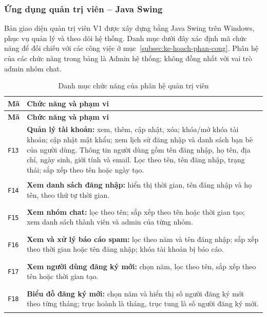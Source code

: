 \subsubsection{Ứng dụng quản trị viên -- Java Swing}
\label{subsubsec:client-admin}

Bản giao diện quản trị viên V1 được xây dựng bằng Java Swing trên Windows,
phục vụ quản lý và theo dõi hệ thống. Danh mục dưới đây xác định mã chức năng
để đối chiếu với các công việc ở mục~\ref{subsec:ke-hoach-phan-cong}.
Phân hệ của các chức năng trong bảng
là Admin hệ thống; không đồng nhất với vai trò admin nhóm chat.

\begingroup
\small
\begin{longtable}{|C{1.2cm}|L{\dimexpr\textwidth-1.2cm-4\arrayrulewidth\relax}|}
  \caption{Danh mục chức năng của phân hệ quản trị viên}
  \label{tab:chuc-nang-admin}\\
  \hline
  \textbf{Mã} & \textbf{Chức năng và phạm vi}\\
  \hline
  \endfirsthead
  \hline
  \textbf{Mã} & \textbf{Chức năng và phạm vi}\\
  \hline
  \endhead
  \hypertarget{F13}{\texttt{F13}} &
  \textbf{Quản lý tài khoản:} xem, thêm, cập nhật, xóa; khóa/mở khóa tài khoản;
  cập nhật mật khẩu; xem lịch sử đăng nhập và danh sách bạn bè của người dùng.
  Thông tin người dùng gồm tên đăng nhập, họ tên, địa chỉ, ngày sinh,
  giới tính và email.
  Lọc theo tên, tên đăng nhập, trạng thái; sắp xếp theo tên hoặc ngày tạo.\\
  \hline
  \hypertarget{F14}{\texttt{F14}} &
  \textbf{Xem danh sách đăng nhập:} hiển thị thời gian, tên đăng nhập và họ tên,
  theo thứ tự thời gian.\\
  \hline
  \hypertarget{F15}{\texttt{F15}} &
  \textbf{Xem nhóm chat:} lọc theo tên; sắp xếp theo tên hoặc thời gian tạo;
  xem danh sách thành viên và admin của từng nhóm.\\
  \hline
  \hypertarget{F16}{\texttt{F16}} &
  \textbf{Xem và xử lý báo cáo spam:} lọc theo năm và tên đăng nhập;
  sắp xếp theo thời gian hoặc tên đăng nhập; khóa tài khoản bị báo cáo.\\
  \hline
  \hypertarget{F17}{\texttt{F17}} &
  \textbf{Xem người dùng đăng ký mới:} chọn năm, lọc theo tên,
  sắp xếp theo tên hoặc thời gian tạo.\\
  \hline
  \hypertarget{F18}{\texttt{F18}} &
  \textbf{Biểu đồ đăng ký mới:} chọn năm và hiển thị số người đăng ký mới
  theo từng tháng; trục hoành là tháng, trục tung là số người đăng ký mới.\\

\end{longtable}
